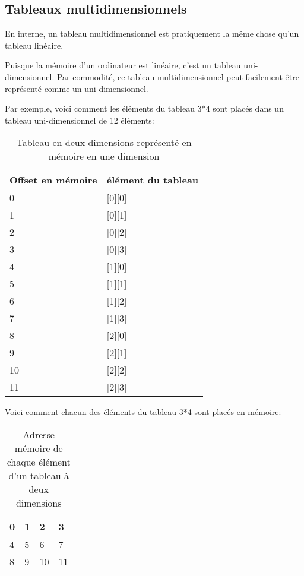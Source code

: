 \subsection{Tableaux multidimensionnels}

En interne, un tableau multidimensionnel est pratiquement la même chose qu'un tableau
linéaire.

Puisque la mémoire d'un ordinateur est linéaire, c'est un tableau uni-dimensionnel.
Par commodité, ce tableau multidimensionnel peut facilement être représenté comme
un uni-dimensionnel.

Par exemple, voici comment les éléments du tableau 3*4 sont placés dans un tableau
uni-dimensionnel de 12 éléments:

\begin{table}[H]
\centering
\begin{tabular}{ | l | l | }
\hline
Offset en mémoire & élément du tableau \\
\hline
0 & [0][0] \\
\hline
1 & [0][1] \\
\hline
2 & [0][2] \\
\hline
3 & [0][3] \\
\hline
4 & [1][0] \\
\hline
5 & [1][1] \\
\hline
6 & [1][2] \\
\hline
7 & [1][3] \\
\hline
8 & [2][0] \\
\hline
9 & [2][1] \\
\hline
10 & [2][2] \\
\hline
11 & [2][3] \\
\hline
\end{tabular}
\caption{Tableau en deux dimensions représenté en mémoire en une dimension}
\end{table}

Voici comment chacun des éléments du tableau 3*4 sont placés en mémoire:

\begin{table}[H]
\centering
\begin{tabular}{ | l | l | l | l | }
\hline                        
0 & 1 & 2 & 3 \\
\hline  
4 & 5 & 6 & 7 \\
\hline  
8 & 9 & 10 & 11 \\
\hline  
\end{tabular}
\caption{Adresse mémoire de chaque élément d'un tableau à deux dimensions}
\end{table}

